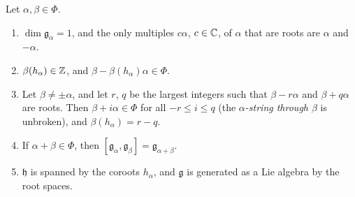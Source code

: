 \begin{theorem}\label{representation-theory:theorem-root-properties}
Let $\alpha, \beta \in \Phi$.
\begin{enumerate}
\item $\dim\mathfrak{g}_\alpha = 1$, and the only multiples $c\alpha$, $c \in \mathbb{C}$, of $\alpha$ that are roots are $\alpha$ and $-\alpha$.
\item $\beta(h_\alpha) \in \mathbb{Z}$, and $\beta - \beta(h_\alpha)\alpha \in \Phi$.
\item Let $\beta \neq \pm\alpha$, and let $r$, $q$ be the largest integers such that $\beta - r\alpha$ and $\beta + q\alpha$ are roots. Then $\beta + i\alpha \in \Phi$ for all
$-r \leq i \leq q$ (the \emph{$\alpha$-string through $\beta$} is unbroken), and $\beta(h_\alpha) = r - q$.
\item If $\alpha + \beta \in \Phi$, then $[\mathfrak{g}_\alpha, \mathfrak{g}_\beta] = \mathfrak{g}_{\alpha + \beta}$.
\item $\mathfrak{h}$ is spanned by the coroots $h_\alpha$, and $\mathfrak{g}$ is generated as a Lie algebra by the root spaces.
\end{enumerate}
\end{theorem}

